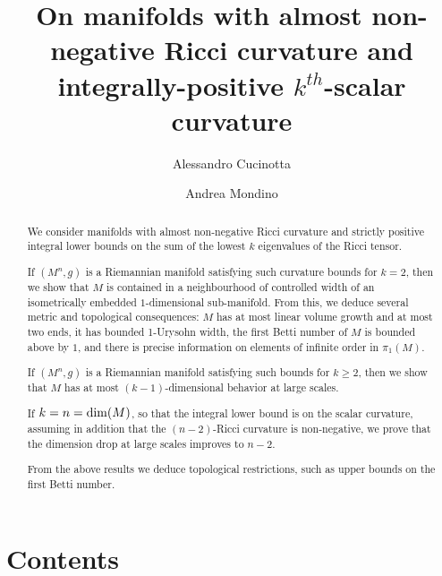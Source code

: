 \documentclass[10pt]{article}
\title{On manifolds with almost non-negative Ricci curvature and integrally-positive $k^{th}$-scalar curvature}
\author{Alessandro Cucinotta \and Andrea Mondino}
\theoremstyle{definition}
\begin{document}
\maketitle

\begin{abstract}
    We consider manifolds with almost non-negative Ricci curvature and strictly positive integral lower bounds on the sum of the lowest $k$ eigenvalues of the Ricci tensor. 

    
    If $(M^n,g)$ is a Riemannian manifold  satisfying such curvature bounds for $k=2$, then we show that $M$  is contained in a neighbourhood of controlled width of an isometrically embedded $1$-dimensional sub-manifold. From this, we deduce several metric and topological consequences: $M$ has at most linear volume growth and at most two ends, it has bounded 1-Urysohn width, the first Betti number of $M$ is bounded above by $1$, and there is precise information on elements of infinite order in  $\pi_1(M)$.

    If $(M^n,g)$ is a Riemannian manifold  satisfying such bounds for $k\geq 2$, then 
    we show that $M$ has at most $(k-1)$-dimensional behavior at large scales. 
    
    If $k=n={\rm dim}(M)$, so that the integral lower bound is on the scalar curvature, assuming in addition that the $(n-2)$-Ricci curvature is non-negative, we prove that the dimension drop at large scales improves to $n-2$. 
    
    From the above results we deduce topological restrictions, such as upper bounds on the first Betti number.
\end{abstract}


\section*{Contents}
%
%
%
%
%
%
%
%
%
\end{document}
